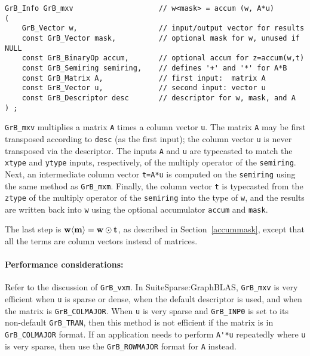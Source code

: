 \documentclass[12pt]{article}
\begin{document}
\begin{mdframed}[userdefinedwidth=6in]
{\footnotesize
\begin{verbatim}
GrB_Info GrB_mxv                    // w<mask> = accum (w, A*u)
(
    GrB_Vector w,                   // input/output vector for results
    const GrB_Vector mask,          // optional mask for w, unused if NULL
    const GrB_BinaryOp accum,       // optional accum for z=accum(w,t)
    const GrB_Semiring semiring,    // defines '+' and '*' for A*B
    const GrB_Matrix A,             // first input:  matrix A
    const GrB_Vector u,             // second input: vector u
    const GrB_Descriptor desc       // descriptor for w, mask, and A
) ;
\end{verbatim} } \end{mdframed}

\verb'GrB_mxv' multiplies a matrix \verb'A' times a column vector \verb'u'.
The matrix \verb'A' may be first transposed according to \verb'desc' (as the
first input); the column vector \verb'u' is never transposed via the
descriptor.  The inputs \verb'A' and \verb'u' are typecasted to match the
\verb'xtype' and \verb'ytype' inputs, respectively, of the multiply operator of
the \verb'semiring'. Next, an intermediate column vector \verb't=A*u' is
computed on the \verb'semiring' using the same method as \verb'GrB_mxm'.
Finally, the column vector \verb't' is typecasted from the \verb'ztype' of the
multiply operator of the \verb'semiring' into the type of \verb'w', and the
results are written back into \verb'w' using the optional accumulator
\verb'accum' and \verb'mask'.

The last step is ${\bf w \langle m \rangle  = w \odot t}$, as described
in Section~\ref{accummask}, except that all the terms are column vectors instead
of matrices.

\paragraph{\bf Performance considerations:} %
Refer to the discussion of \verb'GrB_vxm'.  In SuiteSparse:GraphBLAS,
\verb'GrB_mxv' is very efficient when \verb'u' is sparse or dense, when the
default descriptor is used, and when the matrix is \verb'GrB_COLMAJOR'.  When
\verb'u' is very sparse and \verb'GrB_INP0' is set to its non-default
\verb'GrB_TRAN', then this method is not efficient if the matrix is in
\verb'GrB_COLMAJOR' format.  If an application needs to perform \verb"A'*u"
repeatedly where \verb'u' is very sparse, then use the \verb'GrB_ROWMAJOR' format
for \verb'A' instead.
\end{document}
